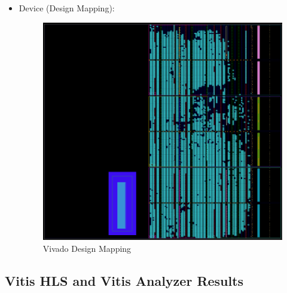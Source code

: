 \documentclass[../main.tex]{subfiles}
\begin{document}
\begin{itemize}
    \vspace{0.7cm}

    \item Device (Design Mapping):
    \begin{figure}[H]
        \centering
        \includegraphics[width=0.7\linewidth]{Images/image18.png}
        \caption{Vivado Design Mapping}
        \label{fig:vivado_mapping}
    \end{figure}
    
\end{itemize}

\newpage

\subsection{Vitis HLS and Vitis Analyzer Results}
\end{document}
